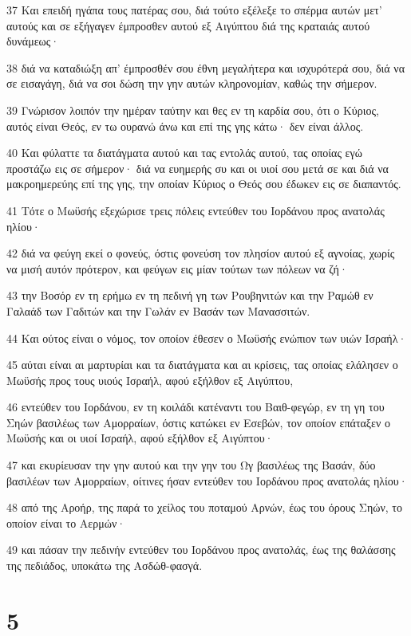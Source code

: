 \par 37 Και επειδή ηγάπα τους πατέρας σου, διά τούτο εξέλεξε το σπέρμα αυτών μετ' αυτούς και σε εξήγαγεν έμπροσθεν αυτού εξ Αιγύπτου διά της κραταιάς αυτού δυνάμεως·
\par 38 διά να καταδιώξη απ' έμπροσθέν σου έθνη μεγαλήτερα και ισχυρότερά σου, διά να σε εισαγάγη, διά να σοι δώση την γην αυτών κληρονομίαν, καθώς την σήμερον.
\par 39 Γνώρισον λοιπόν την ημέραν ταύτην και θες εν τη καρδία σου, ότι ο Κύριος, αυτός είναι Θεός, εν τω ουρανώ άνω και επί της γης κάτω· δεν είναι άλλος.
\par 40 Και φύλαττε τα διατάγματα αυτού και τας εντολάς αυτού, τας οποίας εγώ προστάζω εις σε σήμερον· διά να ευημερής συ και οι υιοί σου μετά σε και διά να μακροημερεύης επί της γης, την οποίαν Κύριος ο Θεός σου έδωκεν εις σε διαπαντός.
\par 41 Τότε ο Μωϋσής εξεχώρισε τρεις πόλεις εντεύθεν του Ιορδάνου προς ανατολάς ηλίου·
\par 42 διά να φεύγη εκεί ο φονεύς, όστις φονεύση τον πλησίον αυτού εξ αγνοίας, χωρίς να μισή αυτόν πρότερον, και φεύγων εις μίαν τούτων των πόλεων να ζή·
\par 43 την Βοσόρ εν τη ερήμω εν τη πεδινή γη των Ρουβηνιτών και την Ραμώθ εν Γαλαάδ των Γαδιτών και την Γωλάν εν Βασάν των Μανασσιτών.
\par 44 Και ούτος είναι ο νόμος, τον οποίον έθεσεν ο Μωϋσής ενώπιον των υιών Ισραήλ·
\par 45 αύται είναι αι μαρτυρίαι και τα διατάγματα και αι κρίσεις, τας οποίας ελάλησεν ο Μωϋσής προς τους υιούς Ισραήλ, αφού εξήλθον εξ Αιγύπτου,
\par 46 εντεύθεν του Ιορδάνου, εν τη κοιλάδι κατέναντι του Βαιθ-φεγώρ, εν τη γη του Σηών βασιλέως των Αμορραίων, όστις κατώκει εν Εσεβών, τον οποίον επάταξεν ο Μωϋσής και οι υιοί Ισραήλ, αφού εξήλθον εξ Αιγύπτου·
\par 47 και εκυρίευσαν την γην αυτού και την γην του Ωγ βασιλέως της Βασάν, δύο βασιλέων των Αμορραίων, οίτινες ήσαν εντεύθεν του Ιορδάνου προς ανατολάς ηλίου·
\par 48 από της Αροήρ, της παρά το χείλος του ποταμού Αρνών, έως του όρους Σηών, το οποίον είναι το Αερμών·
\par 49 και πάσαν την πεδινήν εντεύθεν του Ιορδάνου προς ανατολάς, έως της θαλάσσης της πεδιάδος, υποκάτω της Ασδώθ-φασγά.

\chapter{5}

